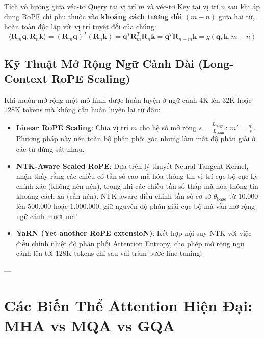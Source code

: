 \begin{theorem}
Tích vô hướng giữa véc-tơ Query tại vị trí $m$ và véc-tơ Key tại vị trí $n$ sau khi áp dụng RoPE chỉ phụ thuộc vào \textbf{khoảng cách tương đối} $(m - n)$ giữa hai từ, hoàn toàn độc lập với vị trí tuyệt đối của chúng:
\begin{equation}
\langle \mathbf{R}_m \mathbf{q}, \mathbf{R}_n \mathbf{k} \rangle = (\mathbf{R}_m \mathbf{q})^T (\mathbf{R}_n \mathbf{k}) = \mathbf{q}^T \mathbf{R}_m^T \mathbf{R}_n \mathbf{k} = \mathbf{q}^T \mathbf{R}_{n-m} \mathbf{k} = g(\mathbf{q}, \mathbf{k}, m - n)
\label{eq:rope-relative-distance-proof}
\end{equation}
\end{theorem}

\subsection{Kỹ Thuật Mở Rộng Ngữ Cảnh Dài (Long-Context RoPE Scaling)}
Khi muốn mở rộng một mô hình được huấn luyện ở ngữ cảnh $4\text{K}$ lên $32\text{K}$ hoặc $128\text{K}$ tokens mà không cần huấn luyện lại từ đầu:
\begin{itemize}
  \item \textbf{Linear RoPE Scaling}: Chia vị trí $m$ cho hệ số mở rộng $s = \frac{L_{\text{target}}}{L_{\text{train}}}$: $m' = \frac{m}{s}$. Phương pháp này nén toàn bộ phân phối góc nhưng làm mất độ phân giải ở các từ đứng sát nhau.
  \item \textbf{NTK-Aware Scaled RoPE}: Dựa trên lý thuyết Neural Tangent Kernel, nhận thấy rằng các chiều có tần số cao mã hóa thông tin vị trí cục bộ cực kỳ chính xác (không nên nén), trong khi các chiều tần số thấp mã hóa thông tin khoảng cách xa (cần nén). NTK-aware điều chỉnh tần số cơ sở $\theta_{\text{base}}$ từ $10.000$ lên $500.000$ hoặc $1.000.000$, giữ nguyên độ phân giải cục bộ mà vẫn mở rộng ngữ cảnh mượt mà!
  \item \textbf{YaRN (Yet another RoPE extensioN)}: Kết hợp nội suy NTK với việc điều chỉnh nhiệt độ phân phối Attention Entropy, cho phép mở rộng ngữ cảnh lên tới $128\text{K}$ tokens chỉ sau vài trăm bước fine-tuning!
\end{itemize}

---

\section{Các Biến Thể Attention Hiện Đại: MHA vs MQA vs GQA}
\label{sec:mha-mqa-gqa}

